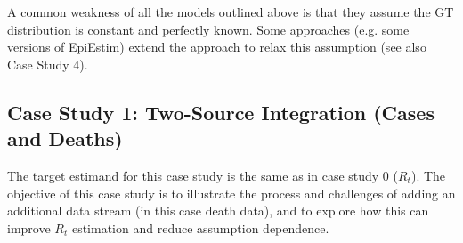\documentclass{article}
\begin{document}
A common weakness of all the models outlined above is that they assume the GT distribution is constant and perfectly known. Some approaches (e.g. some versions of EpiEstim) extend the approach to relax this assumption (see also Case Study 4).
 




\subsection{Case Study 1: Two-Source Integration (Cases and Deaths)}

The target estimand for this case study is the same as in case study 0 ($R_t$). The objective of this case study is to illustrate the process and challenges of adding an additional data stream (in this case death data), and to explore how this can improve $R_t$ estimation and reduce assumption dependence.
\end{document}
